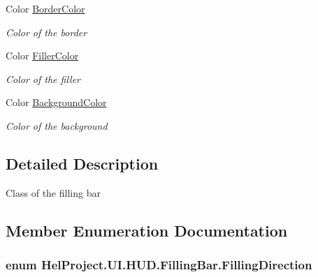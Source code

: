 \begin{DoxyCompactItemize}
Color \hyperlink{class_hel_project_1_1_u_i_1_1_h_u_d_1_1_filling_bar_ac365e60a3ed20adc75bc905a7f1fac4d}{Border\+Color}
\begin{DoxyCompactList}\small\item\em Color of the border \end{DoxyCompactList}\item 
Color \hyperlink{class_hel_project_1_1_u_i_1_1_h_u_d_1_1_filling_bar_a8257b6c2fab14e9edbcd85dbf6fe0756}{Filler\+Color}
\begin{DoxyCompactList}\small\item\em Color of the filler \end{DoxyCompactList}\item 
Color \hyperlink{class_hel_project_1_1_u_i_1_1_h_u_d_1_1_filling_bar_af16a8f5b8eb88b0c5bd52dda6ce58cec}{Background\+Color}
\begin{DoxyCompactList}\small\item\em Color of the background \end{DoxyCompactList}\end{DoxyCompactItemize}


\subsection{Detailed Description}
Class of the filling bar 



\subsection{Member Enumeration Documentation}
\hypertarget{class_hel_project_1_1_u_i_1_1_h_u_d_1_1_filling_bar_a2f19768a47999784b10d84eabca4c86e}{}
\subsubsection[{Filling\+Direction}]{\setlength{\rightskip}{0pt plus 5cm}enum {\bf Hel\+Project.\+U\+I.\+H\+U\+D.\+Filling\+Bar.\+Filling\+Direction}}\label{class_hel_project_1_1_u_i_1_1_h_u_d_1_1_filling_bar_a2f19768a47999784b10d84eabca4c86e}


